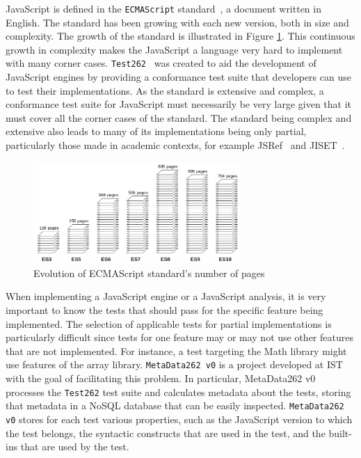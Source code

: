 \documentclass[runningheads]{llncs}
\begin{document}
JavaScript is defined in the \texttt{ECMAScript} standard~\cite{ECMAScript}, a document written in English. The standard has been growing with each new version, both in size and complexity. The growth of the standard is illustrated in Figure \ref{fig:paginas_standard_version}. This continuous growth in complexity makes the JavaScript a language very hard to implement with many corner cases. \texttt{Test262}~\cite{Test262} was created to aid the development of JavaScript engines by providing a conformance test suite that developers can use to test their implementations. As the standard is extensive and complex, a conformance test suite for JavaScript must necessarily be very large given that it must cover all the corner cases of the standard. The standard being complex and extensive also leads to many of its implementations being only partial, particularly those made in academic contexts, for example JSRef~\cite{JSCert-2014} and JISET~\cite{JISET-2020}.


\begin{figure}[ht]
    \centering
    \includegraphics[width=0.7\textwidth]{images/standard_pages_evolution.png}
    \caption{Evolution of ECMAScript standard's number of pages}
    \label{fig:paginas_standard_version}
\end{figure}




When implementing a JavaScript engine or a JavaScript analysis, it is very important to know the tests that should pass for the specific feature being implemented. The selection of applicable tests for partial implementations is particularly difficult since tests for one feature may or may not use other features that are not implemented. For instance, a test targeting the Math library might use features of the array library. \texttt{MetaData262 v0} is a project developed at IST with the goal of facilitating this problem. In particular, MetaData262 v0 processes the \texttt{Test262} test suite and calculates metadata about the tests, storing that metadata in a NoSQL database that can be easily inspected. \texttt{MetaData262 v0} stores for each test various properties, such as the JavaScript version to which the test belongs, the syntactic constructs that are used in the test, and the built-ins that are used by the test.
\end{document}
